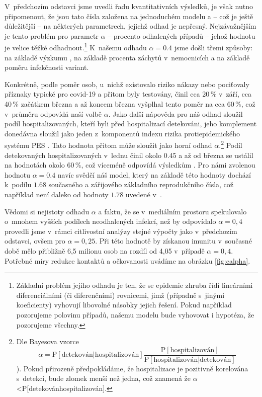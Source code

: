 V~předchozím odstavci jsme uvedli řadu kvantitativních výsledků, je
však nutno připomenout, že jsou tato čísla založena na jednoduchém
modelu a -- což je ještě důležitější -- na některých parametrech,
jejichž odhad je nepřesný. Nejzávažnějším je tento problém pro parametr
$\alpha$ -- procento odhalených případů -- jehož hodnotu je velice
těžké odhadnout.\footnote{Základní problém jejího odhadu je ten, že se epidemie zhruba řídí
lineárními diferenciálními (či diferenčními) rovnicemi, jimž (případně
s~jinými koeficienty) vyhovují libovolné násobky jejich řešení. Pokud
například pozorujeme polovinu případů, našemu modelu bude vyhovovat
i hypotéza, že pozorujeme všechny.} K~našemu odhadu $\alpha=0.4$ jsme došli třemi způsoby: na základě výzkumu
\cite{paqcovid}, na základě procenta záchytů v~nemocnicích a na základě poměru infekčnosti
variant. 

Konkrétně, podle \cite{paqcovid} poměr osob, u~nichž existovalo riziko
nákazy nebo pociťovaly příznaky typické pro covid-19 a přitom byly testovány,
činil cca 20\,\% v~září, cca 40\,\% začátkem března a až koncem března
vyšplhal tento poměr na cca 60\,\%, což v~průměru odpovídá naší volbě $\alpha.$
Jako další nápověda pro náš odhad sloužil podíl hospitalizovaných,
kteří byli před hospitalizací detekováni, jeho komplement donedávna sloužil jako
jeden z~komponentů indexu rizika protiepidemického systému PES \cite{PES}. Tato hodnota přitom může sloužit jako horní odhad $\alpha$.\footnote{Dle Bayesova vzorce 
\[
\alpha=\mathrm{P}[\text{detekován}|\text{hospitalizován}]\frac{\mathrm{P}[\text{hospitalizován}]}{\mathrm{P}[\text{hospitalizován}|\text{detekován}]}
\]
\cite{Pribylova2021Model}). Pokud přirozeně předpokládáme, že hospitalizace
je pozitivně korelována s~detekcí, bude zlomek menší než jedna,
což znamená že $\alpha$\textless P{[}detekován\textbar hospitalizován{]}. } 
Podíl detekovaných hospitalizovaných v~lednu činil okolo 0.45 a až od března se ustálil
na hodnotách okolo 60\,\%, což víceméně odpovídá výsledkům \cite{paqcovid}. 
Pro námi zvolenou hodnotu $\alpha=0.4$ navíc svědčí náš model, který na základě této hodnoty dochází k~podílu $1.68$ současného a zářijového základního reprodukčního čísla, což například není daleko od hodnoty $1.78$ uvedené v~\cite{curran2021transmission}. 

Vědomi si nejistoty odhadu $\alpha$ a faktu, že se v~mediálním prostoru spekulovalo o~mnohem vyšších podílech neodhalených infekcí, než by odpovídalo $\alpha=0,4$ provedli
jsme v~rámci citlivostní analýzy stejné výpočty jako v~předchozím
odstavci, ovšem pro $\alpha=0,25$. Při této hodnotě by získanou
imunitu v~současné době mělo přibližně 6,5 milionu osob na rozdíl od 4,05
v~případě $\alpha=0,4$. Potřebné míry redukce kontaktů a očkovanosti uvádíme na obrázku \ref{fig:calpha}.

